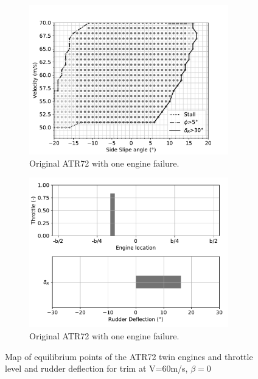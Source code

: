 \begin{figure}[hbt]
	\centering
	\begin{subfigure}{0.49\textwidth}
		\includegraphics[width=0.95\textwidth]{originalMapBetaVelfin1Eng3RudFalse}
		\caption{Original ATR72 with one engine failure.}
		\label{fig:originalfin1_3engine}
	\end{subfigure}
	\begin{subfigure}{0.49\textwidth}
		\includegraphics[width=0.95\textwidth]{Defloriginalfin1Eng3RudFalse}
		\caption{Original ATR72 with one engine failure.}
		\label{fig:Defloriginalfin1_3engine}
	\end{subfigure}
	\caption{Map of equilibrium points of the ATR72 twin engines and throttle level and rudder deflection for trim at V=60m/s, $\beta=0$} \label{MapOrignialTwin+DEP}
\end{figure}

